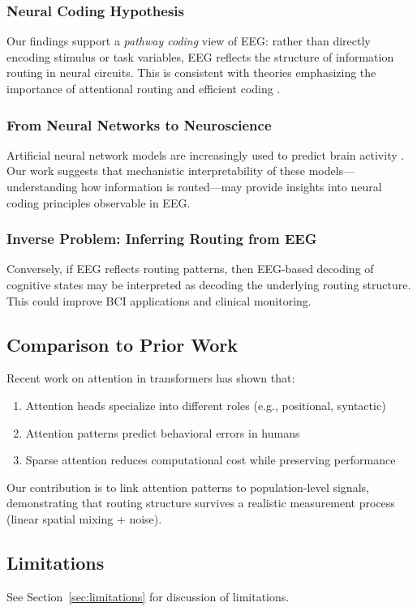 \subsubsection{Neural Coding Hypothesis}

Our findings support a \textit{pathway coding} view of EEG: rather than directly encoding stimulus or task variables, EEG reflects the structure of information routing in neural circuits. This is consistent with theories emphasizing the importance of attentional routing \cite{Desimone1990, Luck2004} and efficient coding \cite{Barlow1961}.

\subsubsection{From Neural Networks to Neuroscience}

Artificial neural network models are increasingly used to predict brain activity \cite{Schrimpf2018, Conwell2022}. Our work suggests that mechanistic interpretability of these models—understanding how information is routed—may provide insights into neural coding principles observable in EEG.

\subsubsection{Inverse Problem: Inferring Routing from EEG}

Conversely, if EEG reflects routing patterns, then EEG-based decoding of cognitive states may be interpreted as decoding the underlying routing structure. This could improve BCI applications and clinical monitoring.

\subsection{Comparison to Prior Work}

Recent work on attention in transformers has shown that:

\begin{enumerate}
    \item Attention heads specialize into different roles (e.g., positional, syntactic) \cite{Clark2019}
    \item Attention patterns predict behavioral errors in humans \cite{Koyamada2019}
    \item Sparse attention reduces computational cost while preserving performance \cite{Child2019}
\end{enumerate}

Our contribution is to link attention patterns to population-level signals, demonstrating that routing structure survives a realistic measurement process (linear spatial mixing + noise).

\subsection{Limitations}

See Section~\ref{sec:limitations} for discussion of limitations.
